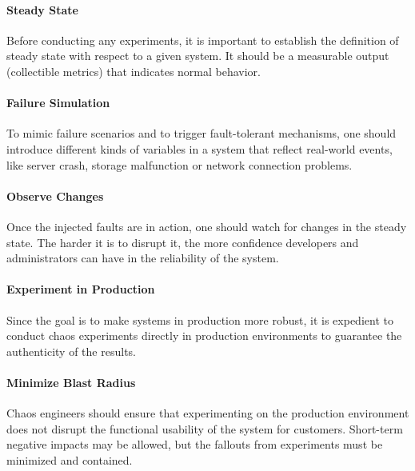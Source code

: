 \paragraph{Steady State} Before conducting any experiments, it is important to establish the definition of steady state with respect to a given system. It should be a measurable output (\eg collectible metrics) that indicates normal behavior.

\paragraph{Failure Simulation} To mimic failure scenarios and to trigger fault-tolerant mechanisms, one should introduce different kinds of variables in a system that reflect real-world events, like server crash, storage malfunction or network connection problems.

\paragraph{Observe Changes} Once the injected faults are in action, one should watch for changes in the steady state. The harder it is to disrupt it, the more confidence developers and administrators can have in the reliability of the system.

\paragraph{Experiment in Production} Since the goal is to make systems in production more robust, it is expedient to conduct chaos experiments directly in production environments to guarantee the authenticity of the results.

\paragraph{Minimize Blast Radius} Chaos engineers should ensure that experimenting on the production environment does not disrupt the functional usability of the system for customers. Short-term negative impacts may be allowed, but the fallouts from experiments must be minimized and contained.

